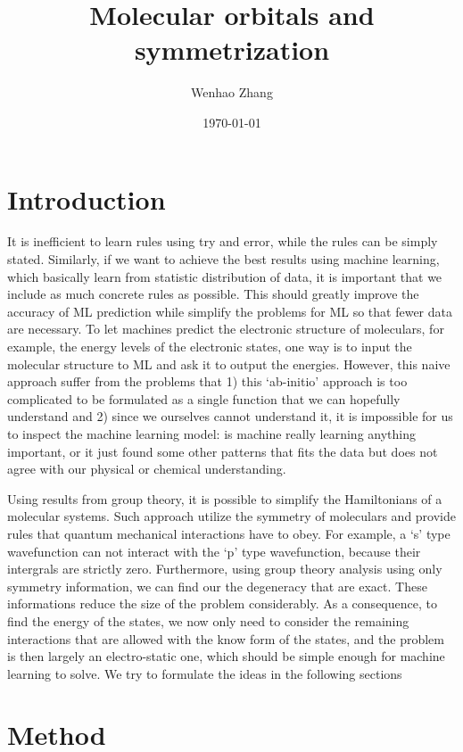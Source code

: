 \documentclass{article}
\begin{document}
\title{Molecular orbitals and symmetrization}
\author{Wenhao Zhang}
\date{\today}
\maketitle

\section{Introduction}

It is inefficient to learn rules using try and error, while the rules can be 
simply stated. 
Similarly, if we want to achieve the best results using machine learning, which 
basically learn from statistic distribution of data, 
it is important that we include as much concrete rules as possible. 
This should greatly improve the accuracy of ML prediction while simplify the 
problems for ML so that fewer data are necessary.
To let machines predict the electronic structure of moleculars, for example, the 
energy levels of the electronic states, 
one way is to input the molecular structure to ML and ask it to output the energies. 
However, this naive approach suffer from the problems that 1) this `ab-initio' approach
is too complicated to be formulated as a single function that we can hopefully understand 
and 2) since we ourselves cannot understand it, it is impossible for us to inspect the 
machine learning model: is machine really learning anything important, or it just 
found some other patterns that fits the data but does not agree with our physical 
or chemical understanding. 

Using results from group theory, it is possible to simplify the Hamiltonians of 
a molecular systems. Such approach utilize the symmetry of moleculars and provide
rules that quantum mechanical interactions have to obey. 
For example, a `s' type wavefunction can not interact with the `p' type wavefunction,
because their intergrals are strictly zero. 
Furthermore, using group theory analysis using only symmetry information, we can find 
our the degeneracy that are exact. 
These informations reduce the size of the problem considerably. As a consequence, to 
find the energy of the states, we now only need to consider the remaining interactions 
that are allowed with the know form of the states, and the problem is then largely 
an electro-static one, which should be simple enough for machine learning to solve.
We try to formulate the ideas in the following sections

\section{Method}
\end{document}
